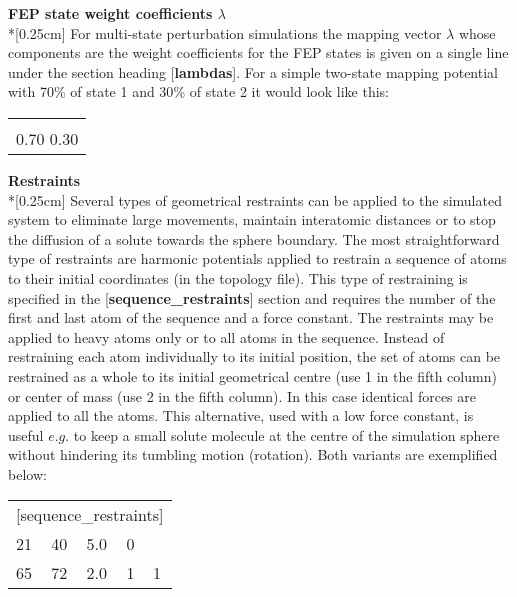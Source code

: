 \documentclass[a4paper,10pt]{article}
\begin{document}
\bigskip
\textbf{FEP state weight coefficients $\lambda $}\\*[0.25cm] For
multi-state perturbation simulations the mapping vector $\lambda $
whose components are the weight coefficients for the FEP states is
given on a single line under the section heading
[\textbf{lambdas}]. For a simple two-state mapping potential with
70{\%} of state 1 and 30{\%} of state 2 it would look like this:

\begin{center}
\begin{tabularx}{\textwidth}{|X|}
  \hline
  [lambdas] \\
  0.70 0.30 \\ \hline
\end{tabularx}
\end{center}


\bigskip
\textbf{Restraints}\\*[0.25cm] 
Several  types  of  geometrical  restraints  can  be  applied  to  the
simulated system  to eliminate  large movements,  maintain interatomic
distances or  to stop  the diffusion  of a  solute towards  the sphere
boundary.  The most  straightforward type  of restraints  are harmonic
potentials applied  to restrain a  sequence of atoms to  their initial
coordinates  (in the  topology  file).  This  type  of restraining  is
specified   in  the   [\textbf{sequence{\_}restraints}]  section   and
requires the number of  the first and last atom of  the sequence and a
force constant. The  restraints may be applied to heavy  atoms only or
to  all  atoms in  the  sequence.  Instead  of restraining  each  atom
individually  to  its  initial  position,  the set  of  atoms  can  be
restrained as a whole to its  initial geometrical centre (use 1 in the
fifth column) or center  of mass (use 2 in the  fifth column). In this
case identical forces are applied  to all the atoms. This alternative,
used  with a  low force  constant, is  useful $e.g.$  to keep  a small
solute  molecule  at  the  centre of  the  simulation  sphere  without
hindering   its  tumbling   motion  (rotation).   Both  variants   are
exemplified below:

\begin{center}
\begin{tabularx}{\textwidth}{|l l l l X|}
  \hline
  \multicolumn{5}{|l|}{[sequence{\_}restraints]} \\
  21 & 40 & 5.0 & 0 & \\
  65 & 72 & 2.0 & 1 & 1 \\ \hline
\end{tabularx}
\end{center}
\end{document}

